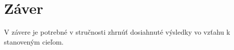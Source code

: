 \section*{Záver}

V závere je potrebné v stručnosti zhrnúť dosiahnuté výsledky vo vzťahu k stanoveným cieľom.

\label{text-end}